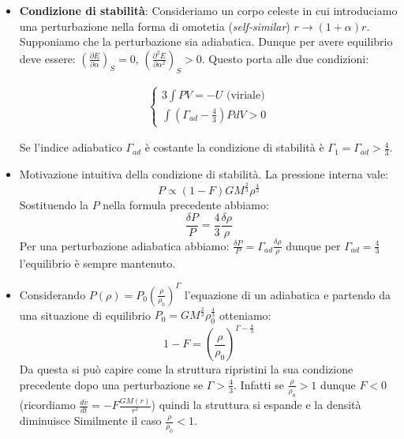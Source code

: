 \documentclass[11pt,a4paper]{article}
\begin{document}
\begin{itemize}
\item \textbf{Condizione di stabilità}: Consideriamo un corpo celeste in cui introduciamo una perturbazione nella forma di omotetia (\textit{self-similar}) $r \rightarrow \left( 1 + \alpha 	\right) r$. Supponiamo che la perturbazione sia adiabatica. Dunque per avere equilibrio deve essere: $\left( \frac{\partial E}{\partial \alpha} \right) _ {S} = 0$, $\left( \frac{ \partial^2 E} {\partial \alpha ^2} \right) _S > 0$. Questo porta alle due condizioni:

\begin{gather}
\begin{cases}
3 \int P V = - U \text{ (viriale)}\\
\int \left( \Gamma_{ad} - \frac{4}{3} \right) P dV > 0
\end{cases}
\end{gather}

Se l'indice adiabatico $\Gamma_{ad}$ è costante la condizione di stabilità è $\Gamma_1 = \Gamma_{ad} > \frac{4}{3}$.

\item Motivazione intuitiva della condizione di stabilità. La pressione interna vale:
\begin{equation}
P \propto (1 - F) G M^{\frac{2}{3}} \rho^{\frac{4}{3}}
\end{equation}
Sostituendo la $P$ nella formula precedente abbiamo:
\begin{equation}
\frac{\delta P}{P} = \frac{4}{3} \frac{\delta \rho}{\rho}
\end{equation}
Per una perturbazione adiabatica abbiamo: $\frac{\delta P}{P} = \Gamma_{ad} \frac{\delta \rho}{\rho}$ dunque per $\Gamma_{ad} = \frac{4}{3}$ l'equilibrio è sempre mantenuto.

\item Considerando $P(\rho) = P_0 \left( \frac{\rho}{\rho_0} \right)^{\Gamma}$ l'equazione di un adiabatica e partendo da una situazione di equilibrio $P_0 = G M ^{\frac{2}{3}} \rho_{0}^{\frac{4}{3}}$ otteniamo:
\begin{equation}
1 - F = \left(\frac{\rho}{\rho_0} \right)^{\Gamma - \frac{4}{3}}
\end{equation}
Da questa si può capire come la struttura ripristini la sua condizione precedente dopo una perturbazione se $\Gamma > \frac{4}{3}$. Infatti se $\frac{\rho}{\rho_0} > 1$ dunque $F<0$ (ricordiamo $\frac{d v}{d t} = - F \frac{G M(r)}{r^2}$) quindi la struttura si espande e la densità diminuisce Similmente il caso $\frac{\rho}{\rho_0} < 1$.


\end{itemize}
\end{document}
